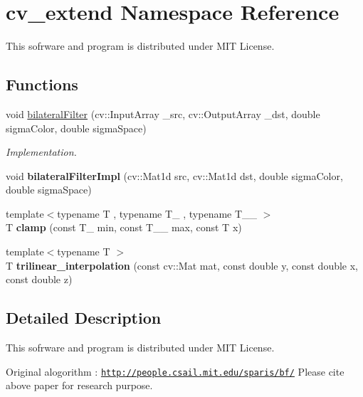 \section{cv\+\_\+extend Namespace Reference}
\label{namespacecv__extend}


This sofrware and program is distributed under M\+IT License.  


\subsection*{Functions}
\begin{DoxyCompactItemize}
\item 
void \hyperlink{namespacecv__extend_a2bfc33f05bbb6e235e984b33647abe30}{bilateral\+Filter} (cv\+::\+Input\+Array \+\_\+src, cv\+::\+Output\+Array \+\_\+dst, double sigma\+Color, double sigma\+Space)\label{namespacecv__extend_a2bfc33f05bbb6e235e984b33647abe30}

\begin{DoxyCompactList}\small\item\em Implementation. \end{DoxyCompactList}\item 
void {\bfseries bilateral\+Filter\+Impl} (cv\+::\+Mat1d src, cv\+::\+Mat1d dst, double sigma\+Color, double sigma\+Space)\label{namespacecv__extend_ad63779611742d7ce3b6cf45184734e39}

\item 
{\footnotesize template$<$typename T , typename T\+\_\+ , typename T\+\_\+\+\_\+ $>$ }\\T {\bfseries clamp} (const T\+\_\+ min, const T\+\_\+\+\_\+ max, const T x)\label{namespacecv__extend_a27b3ee63437f807a97f75586e4478638}

\item 
{\footnotesize template$<$typename T $>$ }\\T {\bfseries trilinear\+\_\+interpolation} (const cv\+::\+Mat mat, const double y, const double x, const double z)\label{namespacecv__extend_a7c5f8aaf3530641456744f464f3ed816}

\end{DoxyCompactItemize}


\subsection{Detailed Description}
This sofrware and program is distributed under M\+IT License. 

Original alogorithm \+: \href{http://people.csail.mit.edu/sparis/bf/}{\tt http\+://people.\+csail.\+mit.\+edu/sparis/bf/} Please cite above paper for research purpose.

